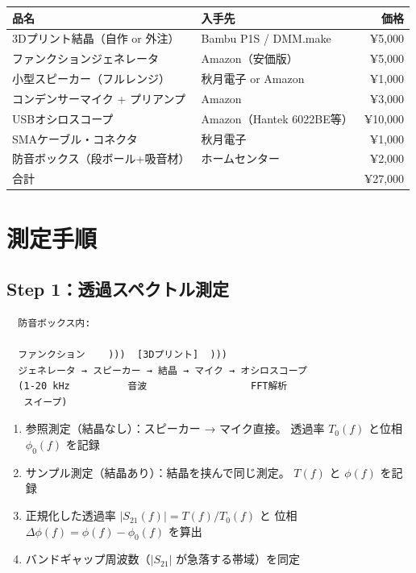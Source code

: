 \documentclass[11pt,a4paper]{article}
\def\textbf#1{#1}%
\begin{document}
\begin{tcolorbox}[colback=blue!5,colframe=blue!50!black,title=部品リスト（合計 ¥27,000 / \$180）]
\begin{tabular}{llr}
\toprule
品名 & 入手先 & 価格 \\
\midrule
3Dプリント結晶（自作 or 外注） & Bambu P1S / DMM.make & ¥5,000 \\
ファンクションジェネレータ & Amazon（安価版） & ¥5,000 \\
小型スピーカー（フルレンジ） & 秋月電子 or Amazon & ¥1,000 \\
コンデンサーマイク + プリアンプ & Amazon & ¥3,000 \\
USBオシロスコープ & Amazon（Hantek 6022BE等） & ¥10,000 \\
SMAケーブル・コネクタ & 秋月電子 & ¥1,000 \\
防音ボックス（段ボール+吸音材） & ホームセンター & ¥2,000 \\
\midrule
\textbf{合計} & & \textbf{¥27,000} \\
\bottomrule
\end{tabular}
\end{tcolorbox}


\section{測定手順}

\subsection{Step 1：透過スペクトル測定}

\begin{verbatim}
  防音ボックス内:

  ファンクション    )))  [3Dプリント]  )))
  ジェネレータ → スピーカー → 結晶 → マイク → オシロスコープ
  (1-20 kHz          音波                  FFT解析
   スイープ)
\end{verbatim}

\begin{enumerate}
\item \textbf{参照測定}（結晶なし）：スピーカー → マイク直接。
  透過率 $T_0(f)$ と位相 $\phi_0(f)$ を記録
\item \textbf{サンプル測定}（結晶あり）：結晶を挟んで同じ測定。
  $T(f)$ と $\phi(f)$ を記録
\item 正規化した透過率 $|S_{21}(f)| = T(f)/T_0(f)$ と
  位相 $\Delta\phi(f) = \phi(f) - \phi_0(f)$ を算出
\item バンドギャップ周波数（$|S_{21}|$ が急落する帯域）を同定
\end{enumerate}
\end{document}
